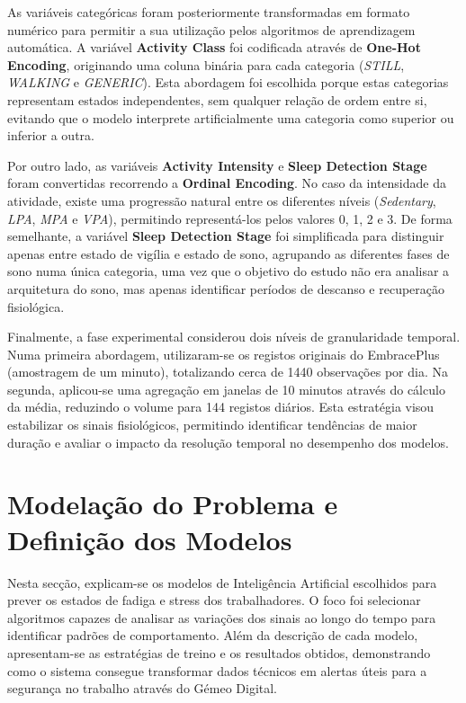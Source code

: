 As variáveis categóricas foram posteriormente transformadas em formato numérico para permitir a sua utilização pelos algoritmos de aprendizagem automática. A variável \textbf{Activity Class} foi codificada através de \textbf{One-Hot Encoding}, originando uma coluna binária para cada categoria (\textit{STILL}, \textit{WALKING} e \textit{GENERIC}). Esta abordagem foi escolhida porque estas categorias representam estados independentes, sem qualquer relação de ordem entre si, evitando que o modelo interprete artificialmente uma categoria como superior ou inferior a outra.

Por outro lado, as variáveis \textbf{Activity Intensity} e \textbf{Sleep Detection Stage} foram convertidas recorrendo a \textbf{Ordinal Encoding}. No caso da intensidade da atividade, existe uma progressão natural entre os diferentes níveis (\textit{Sedentary}, \textit{LPA}, \textit{MPA} e \textit{VPA}), permitindo representá-los pelos valores 0, 1, 2 e 3. De forma semelhante, a variável \textbf{Sleep Detection Stage} foi simplificada para distinguir apenas entre estado de vigília e estado de sono, agrupando as diferentes fases de sono numa única categoria, uma vez que o objetivo do estudo não era analisar a arquitetura do sono, mas apenas identificar períodos de descanso e recuperação fisiológica.

Finalmente, a fase experimental considerou dois níveis de granularidade temporal. Numa primeira abordagem, utilizaram-se os registos originais do EmbracePlus (amostragem de um minuto), totalizando cerca de 1440 observações por dia. Na segunda, aplicou-se uma agregação em janelas de 10 minutos através do cálculo da média, reduzindo o volume para 144 registos diários. Esta estratégia visou estabilizar os sinais fisiológicos, permitindo identificar tendências de maior duração e avaliar o impacto da resolução temporal no desempenho dos modelos.

\section{Modelação do Problema e Definição dos Modelos}

Nesta secção, explicam-se os modelos de Inteligência Artificial escolhidos para prever os estados de fadiga e stress dos trabalhadores. O foco foi selecionar algoritmos capazes de analisar as variações dos sinais ao longo do tempo para identificar padrões de comportamento. Além da descrição de cada modelo, apresentam-se as estratégias de treino e os resultados obtidos, demonstrando como o sistema consegue transformar dados técnicos em alertas úteis para a segurança no trabalho através do Gémeo Digital.

